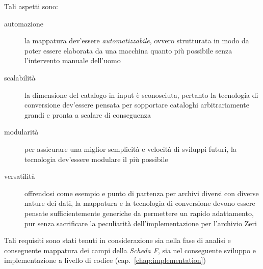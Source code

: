 Tali aspetti sono:
\begin{description}
\item[automazione] la mappatura dev'essere \emph{automatizzabile}, ovvero strutturata in modo da poter essere elaborata da una macchina quanto più possibile senza l'intervento manuale dell'uomo
\item[scalabilità] la dimensione del catalogo in input è sconosciuta, pertanto la tecnologia di conversione dev'essere pensata per sopportare cataloghi arbitrariamente grandi e pronta a scalare di conseguenza
\item[modularità] per assicurare una miglior semplicità e velocità di sviluppi futuri, la tecnologia dev'essere modulare il più possibile
\item[versatilità] offrendosi come esempio e punto di partenza per archivi diversi con diverse nature dei dati, la mappatura e la tecnologia di conversione devono essere pensate sufficientemente generiche da permettere un rapido adattamento, pur senza sacrificare la peculiarità dell'implementazione per l'archivio Zeri
\end{description}

Tali requisiti sono stati tenuti in considerazione sia nella fase di analisi e conseguente mappatura dei campi della \emph{Scheda F}, sia nel conseguente sviluppo e implementazione a livello di codice (cap.~\ref{chap:implementation})
